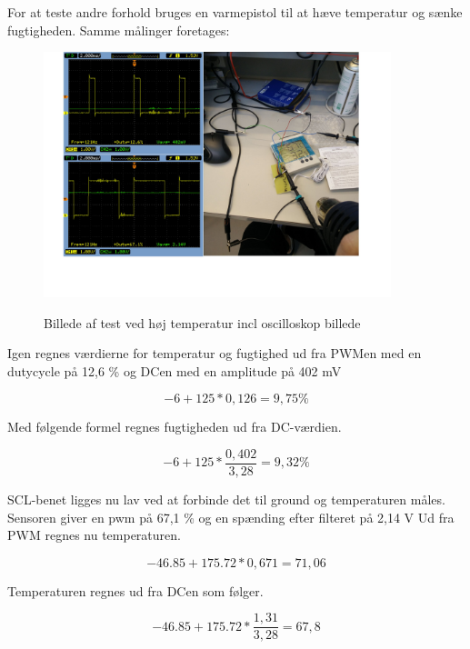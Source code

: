 For at teste andre forhold bruges en varmepistol til at hæve temperatur og sænke fugtigheden. 
Samme målinger foretages:

\begin{figure}[h]
\centering
{\includegraphics[width=0.90\textwidth]{filer/modultest/Billeder/test_varmt}}
\caption{Billede af test ved høj temperatur incl oscilloskop billede}
\label{lab:test_varmt}
\end{figure}

Igen regnes værdierne for temperatur og fugtighed ud fra PWMen med en dutycycle på 12,6 \% og DCen med en amplitude på 402 mV

\begin{equation}
-6+125*0,126= 9,75\%
\end{equation}

Med følgende formel regnes fugtigheden ud fra DC-værdien.

\begin{equation}
-6+125*\frac{0,402}{3,28}= 9,32\%
\end{equation}

SCL-benet ligges nu lav ved at forbinde det til ground og temperaturen måles. Sensoren giver en pwm på 67,1 \% og en spænding efter filteret på 2,14 V Ud fra PWM regnes nu temperaturen.

\begin{equation}
-46.85+175.72*0,671=71,06
\end{equation}

Temperaturen regnes ud fra DCen som følger. 

\begin{equation}
-46.85+175.72*\frac{1,31}{3,28}=67,8
\end{equation}

